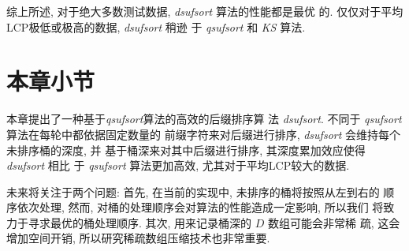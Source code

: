 \documentclass{ws-ijprai}
\begin{document}
综上所述, 对于绝大多数测试数据, \emph{dsufsort} 算法的性能都是最优
的. 仅仅对于平均LCP极低或极高的数据, \emph{dsufsort} 稍逊
于 \emph{qsufsort} 和 \emph{KS} 算法.

\section{本章小节}

本章提出了一种基于\emph{qsufsort}算法的高效的后缀排序算
法 \emph{dsufsort}. 不同于 \emph{qsufsort} 算法在每轮中都依据固定数量的
前缀字符来对后缀进行排序, \emph{dsufsort} 会维持每个未排序桶的深度, 并
基于桶深来对其中后缀进行排序, 其深度累加效应使得 \emph{dsufsort} 相比
于 \emph{qsufsort} 算法更加高效, 尤其对于平均LCP较大的数据.

未来将关注于两个问题: 首先, 在当前的实现中, 未排序的桶将按照从左到右的
顺序依次处理, 然而, 对桶的处理顺序会对算法的性能造成一定影响, 所以我们
将致力于寻求最优的桶处理顺序. 其次, 用来记录桶深的 $D$ 数组可能会非常稀
疏, 这会增加空间开销, 所以研究稀疏数组压缩技术也非常重要.
\end{document}
